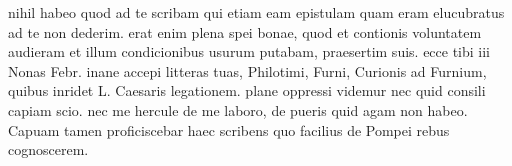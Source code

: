 


 nihil habeo quod ad te scribam qui etiam eam epistulam quam eram elucubratus ad te non dederim. erat enim plena spei bonae, quod et contionis voluntatem audieram et illum condicionibus usurum putabam, praesertim suis. ecce tibi iii Nonas Febr. inane accepi litteras tuas, Philotimi, Furni, Curionis ad Furnium, quibus inridet L. Caesaris legationem. plane oppressi videmur nec quid consili capiam scio. nec me hercule de me laboro, de pueris quid agam non habeo. Capuam tamen proficiscebar haec scribens quo facilius de Pompei rebus cognoscerem.
